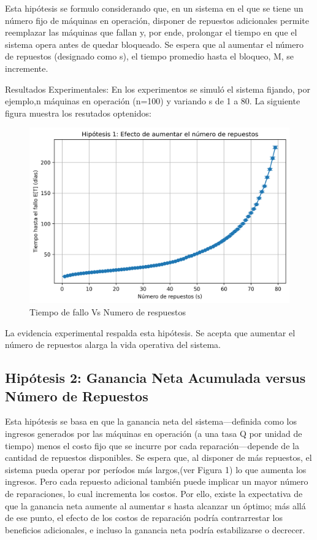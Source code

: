 \documentclass[a4paper,12pt]{article}
\begin{document}
			Esta hipótesis se formulo considerando que, en un sistema en el que se tiene un número fijo de máquinas en operación, disponer de repuestos adicionales permite reemplazar las máquinas que fallan y, por ende, prolongar el tiempo en que el sistema opera antes de quedar bloqueado. Se espera que al aumentar el número de repuestos (designado como s), el tiempo promedio hasta el bloqueo, M, se incremente.
			\newline
			\newline
			
			Resultados Experimentales: En los experimentos se simuló el sistema fijando, por ejemplo,n máquinas en operación (n=100) y variando s
			de 1 a 80. La siguiente figura muestra los resutados optenidos:
			\begin{figure}[H]
				\centering
				\includegraphics[width=\textwidth]{figure1.png}
				\caption{Tiempo de fallo Vs Numero de respuestos}
				\label{fig:Tiempo de fallo Vs Numero de respuestos}
			\end{figure}
			
		La evidencia experimental respalda esta hipótesis. Se acepta que aumentar el número de repuestos alarga la vida operativa del sistema.
			
		\subsection{Hipótesis 2: Ganancia Neta Acumulada versus Número de Repuestos}
		Esta hipótesis se basa en que la ganancia neta del sistema—definida como los ingresos generados por las máquinas en operación (a una tasa 
		Q
		por unidad de tiempo) menos el costo fijo que se incurre por cada reparación—depende de la cantidad de repuestos disponibles. Se espera que, al disponer de más repuestos, el sistema pueda operar por períodos más largos,(ver Figura 1) lo que aumenta los ingresos. Pero cada repuesto adicional también puede implicar un mayor número de reparaciones, lo cual incrementa los costos. Por ello, existe la expectativa de que la ganancia neta aumente al aumentar s
		hasta alcanzar un óptimo; más allá de ese punto, el efecto de los costos de reparación podría contrarrestar los beneficios adicionales, e incluso la ganancia neta podría estabilizarse o decrecer.
		\newline
		\newline
		
\end{document}
